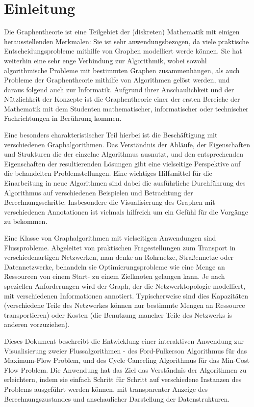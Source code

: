 \chapter*{Einleitung}

Die Graphentheorie ist eine Teilgebiet der (diskreten) Mathematik mit einigen herausstellenden Merkmalen: Sie ist sehr anwendungsbezogen, da viele praktische Entscheidungsprobleme mithilfe von Graphen modelliert werde können. Sie hat weiterhin eine sehr enge Verbindung zur Algorithmik, wobei sowohl algorithmische Probleme mit bestimmten Graphen zusammenhängen, als auch Probleme der Graphentheorie mithilfe von Algorithmen gelöst werden, und daraus folgend auch zur Informatik. Aufgrund ihrer Anschaulichkeit und der Nützlichkeit der Konzepte ist die Graphentheorie einer der ersten Bereiche der Mathematik mit dem Studenten mathematischer, informatischer oder technischer Fachrichtungen in Berührung kommen.

Eine besonders charakteristischer Teil hierbei ist die Beschäftigung mit verschiedenen Graphalgorithmen. Das Verständnis der Abläufe, der Eigenschaften und Strukturen die der einzelne Algorithmus ausnutzt, und den entsprechenden Eigenschaften der resultierenden Lösungen gibt eine vielseitige Perspektive auf die behandelten Problemstellungen. Eine wichtiges Hilfsmittel für die Einarbeitung in neue Algorithmen sind dabei die ausführliche Durchführung des Algorithmus auf verschiedenen Beispielen und Betrachtung der Berechnungsschritte. Insbesondere die Visualisierung des Graphen mit verschiedenen Annotationen ist vielmals hilfreich um ein Gefühl für die Vorgänge zu bekommen.

Eine Klasse von Graphalgorithmen mit vielseitigen Anwendungen sind Flussprobleme. Abgeleitet von praktischen Fragestellungen zum Transport in verschiedenartigen Netzwerken, man denke an Rohrnetze, Straßennetze oder Datennetzwerke, behandeln sie Optimierungsprobleme wie eine Menge an Ressourcen von einem Start- zu einem Zielknoten gelangen kann. Je nach speziellen Anforderungen wird der Graph, der die Netzwerktopologie modelliert, mit verschiedenen Informationen annotiert. Typischerweise sind dies Kapazitäten (verschiedene Teile des Netzwerkes können nur bestimmte Mengen an Ressource transportieren) oder Kosten (die Benutzung mancher Teile des Netzwerks is anderen vorzuziehen).

Dieses Dokument beschreibt die Entwicklung einer interaktiven Anwendung zur Visualisierung zweier Flussalgorithmen - des Ford-Fulkerson Algorithmus für das Maximum-Flow Problem, und des Cycle Canceling Algorithmus für das Min-Cost Flow Problem. Die Anwendung hat das Ziel das Verständnis der Algorithmen zu erleichtern, indem sie einfach Schritt für Schritt auf verschiedene Instanzen des Problems ausgeführt werden können, mit transparenter Anzeige des Berechnungszustandes und anschaulicher Darstellung der Datenstrukturen. 

